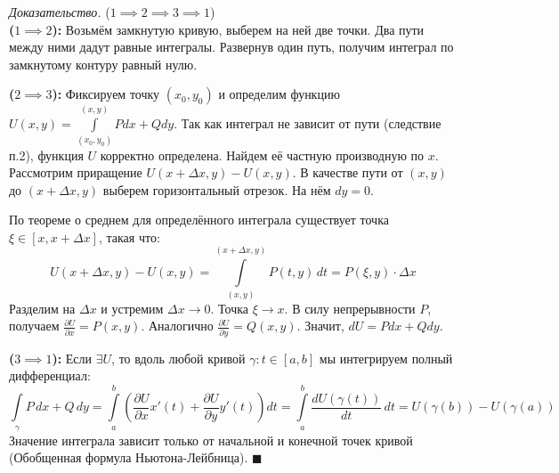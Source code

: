 \documentclass[12pt,a4paper]{article}
\newenvironment{Proof}[1][Доказательство]{\vspace{0.5em}\noindent\textit{#1.}\hspace{0.5em}\ignorespaces}{\hfill$\blacksquare$\vspace{1em}}
\begin{document}
\begin{Proof} ($1 \implies 2 \implies 3 \implies 1$) \\
\textbf{($1 \implies 2$):} Возьмём замкнутую кривую, выберем на ней две точки. Два пути между ними дадут равные интегралы. Развернув один путь, получим интеграл по замкнутому контуру равный нулю.

\textbf{($2 \implies 3$):} Фиксируем точку $(x_0, y_0)$ и определим функцию $U(x,y) = \int\limits_{(x_0,y_0)}^{(x,y)} Pdx + Qdy$. Так как интеграл не зависит от пути (следствие п.2), функция $U$ корректно определена.
Найдем её частную производную по $x$. Рассмотрим приращение $U(x+\Delta x, y) - U(x,y)$. 
В качестве пути от $(x,y)$ до $(x+\Delta x, y)$ выберем горизонтальный отрезок. На нём $dy = 0$.
\begin{center}
\end{center}
По теореме о среднем для определённого интеграла существует точка $\xi \in [x, x+\Delta x]$, такая что:
$$ U(x+\Delta x, y) - U(x, y) = \int\limits_{(x,y)}^{(x+\Delta x, y)} P(t,y) \, dt = P(\xi, y) \cdot \Delta x $$
Разделим на $\Delta x$ и устремим $\Delta x \to 0$. Точка $\xi \to x$. В силу непрерывности $P$, получаем $\frac{\partial U}{\partial x} = P(x,y)$. Аналогично $\frac{\partial U}{\partial y} = Q(x,y)$. Значит, $dU = Pdx + Qdy$.

\textbf{($3 \implies 1$):} Если $\exists U$, то вдоль любой кривой $\gamma: t \in [a, b]$ мы интегрируем полный дифференциал:
$$ \int\limits_\gamma P \, dx + Q \, dy = \int\limits_a^b \left( \frac{\partial U}{\partial x} x'(t) + \frac{\partial U}{\partial y} y'(t) \right) dt = \int\limits_a^b \frac{dU(\gamma(t))}{dt} \, dt = U(\gamma(b)) - U(\gamma(a)) $$
Значение интеграла зависит только от начальной и конечной точек кривой (Обобщенная формула Ньютона-Лейбница).
\end{Proof}
\end{document}
